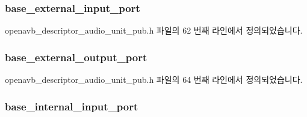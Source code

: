 \subsubsection[{\texorpdfstring{base\+\_\+external\+\_\+input\+\_\+port}{base_external_input_port}}]{ base\+\_\+external\+\_\+input\+\_\+port}\hypertarget{structopenavb__aem__descriptor__audio__unit__t_a5a43e616e847e440cc16722a8375af3d}{}\label{structopenavb__aem__descriptor__audio__unit__t_a5a43e616e847e440cc16722a8375af3d}


openavb\+\_\+descriptor\+\_\+audio\+\_\+unit\+\_\+pub.\+h 파일의 62 번째 라인에서 정의되었습니다.

\subsubsection[{\texorpdfstring{base\+\_\+external\+\_\+output\+\_\+port}{base_external_output_port}}]{ base\+\_\+external\+\_\+output\+\_\+port}\hypertarget{structopenavb__aem__descriptor__audio__unit__t_a886fd3ff6853c84fa7224df0f2b769f2}{}\label{structopenavb__aem__descriptor__audio__unit__t_a886fd3ff6853c84fa7224df0f2b769f2}


openavb\+\_\+descriptor\+\_\+audio\+\_\+unit\+\_\+pub.\+h 파일의 64 번째 라인에서 정의되었습니다.

\subsubsection[{\texorpdfstring{base\+\_\+internal\+\_\+input\+\_\+port}{base_internal_input_port}}]{ base\+\_\+internal\+\_\+input\+\_\+port}\hypertarget{structopenavb__aem__descriptor__audio__unit__t_a14a426676bec9d4b7140402ce60c5fc4}{}\label{structopenavb__aem__descriptor__audio__unit__t_a14a426676bec9d4b7140402ce60c5fc4}


